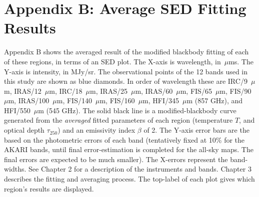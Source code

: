\chapter*{Appendix B: Average SED Fitting Results}
 Appendix B shows the averaged result of the modified blackbody fitting of each of these regions, in terms of an SED plot. The X-axis is wavelength, in~$\mu$ms. The Y-axis is intensity, in MJy/sr. The observational points of the 12 bands used in this study are shown as blue diamonds. In order of wavelength these are IRC/9~$\mu$m, IRAS/12~$\mu$m, IRC/18~$\mu$m, IRAS/25~$\mu$m, IRAS/60~$\mu$m, FIS/65~$\mu$m, FIS/90~$\mu$m, IRAS/100~$\mu$m, FIS/140~$\mu$m, FIS/160~$\mu$m, HFI/345~$\mu$m (857 GHz), and HFI/550~$\mu$m (545 GHz). The solid black line is a modified-blackbody curve generated from the \textit{averaged} fitted parameters of each region (temperature $T$, and optical depth $\tau_{250}$) and an emissivity index $\beta$ of 2. The Y-axis error bars are the based on the photometric errors of each band (tentatively fixed at 10\% for the AKARI bands, until final error-estimation is completed for the all-sky maps. The final errors are expected to be much smaller). The X-errors represent the band-widths. See Chapter 2 for a description of the instruments and bands. Chapter 3 describes the fitting and averaging process. The top-label of each plot gives which region's results are displayed. 
